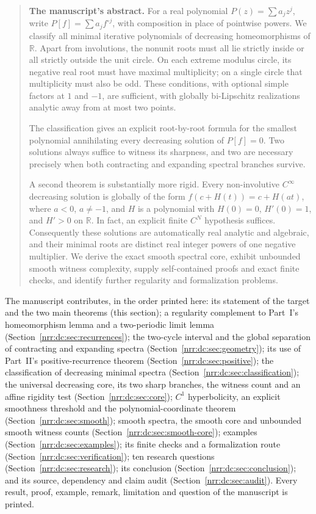 \documentclass[11pt,letterpaper]{article}
\theoremstyle{definition}
\theoremstyle{remark}
\newcommand{\R}{\mathbb R}
\begin{document}
\begin{quote}\small
\textbf{The manuscript's abstract.} For a real polynomial
$P(z)=\sum a_jz^j$, write $P[f]=\sum a_j f^{\circ j}$, with composition in
place of pointwise powers. We classify all minimal iterative polynomials of
decreasing homeomorphisms of $\R$. Apart from involutions, the nonunit roots
must all lie strictly inside or all strictly outside the unit circle. On each
extreme modulus circle, its negative real root must have maximal
multiplicity; on a single circle that multiplicity must also be odd. These
conditions, with optional simple factors at $1$ and $-1$, are sufficient,
with globally bi-Lipschitz realizations analytic away from at most two
points.

The classification gives an explicit root-by-root formula for the smallest
polynomial annihilating every decreasing solution of $P[f]=0$. Two solutions
always suffice to witness its sharpness, and two are necessary precisely when
both contracting and expanding spectral branches survive.

A second theorem is substantially more rigid. Every non-involutive
$C^\infty$ decreasing solution is globally of the form $f(c+H(t))=c+H(at)$,
where $a<0$, $a\ne-1$, and $H$ is a polynomial with $H(0)=0$, $H'(0)=1$, and
$H'>0$ on $\R$. In fact, an explicit finite $C^N$ hypothesis suffices.
Consequently these solutions are automatically real analytic and algebraic,
and their minimal roots are distinct real integer powers of one negative
multiplier. We derive the exact smooth spectral core, exhibit unbounded
smooth witness complexity, supply self-contained proofs and exact finite
checks, and identify further regularity and formalization problems.
\end{quote}

The manuscript contributes, in the order printed here: its statement of the
target and the two main theorems (this section); a regularity complement to
Part~I's homeomorphism lemma and a two-periodic limit lemma
(Section~\ref{nrr:dc:sec:recurrences}); the two-cycle interval and the global
separation of contracting and expanding spectra
(Section~\ref{nrr:dc:sec:geometry}); its use of Part~II's positive-recurrence
theorem (Section~\ref{nrr:dc:sec:positive}); the classification of decreasing
minimal spectra (Section~\ref{nrr:dc:sec:classification}); the universal
decreasing core, its two sharp branches, the witness count and an affine
rigidity test (Section~\ref{nrr:dc:sec:core}); $C^1$ hyperbolicity, an
explicit smoothness threshold and the polynomial-coordinate theorem
(Section~\ref{nrr:dc:sec:smooth}); smooth spectra, the smooth core and
unbounded smooth witness counts (Section~\ref{nrr:dc:sec:smooth-core});
examples (Section~\ref{nrr:dc:sec:examples}); its finite checks and a
formalization route (Section~\ref{nrr:dc:sec:verification}); ten research
questions (Section~\ref{nrr:dc:sec:research}); its conclusion
(Section~\ref{nrr:dc:sec:conclusion}); and its source, dependency and claim
audit (Section~\ref{nrr:dc:sec:audit}). Every result, proof, example, remark,
limitation and question of the manuscript is printed.
\end{document}
